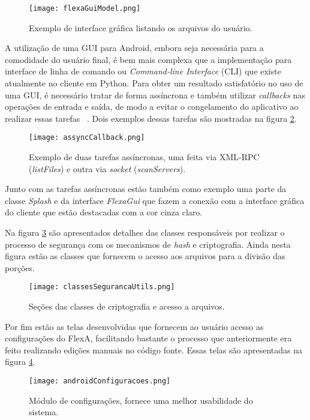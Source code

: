         \begin{figure}[!ht]
        \centering
        \texttt{[image: flexaGuiModel.png]}
        \caption{Exemplo de interface gráfica listando os arquivos do usuário.}
        \label{fig:flexaGuiModel}
        \end{figure}
        
        A utilização de uma GUI para Android, embora seja necessária para a comodidade do usuário final, é bem mais complexa que a implementação para interface de linha de comando ou \textit{Command-line Interface} (CLI) que existe atualmente no cliente em Python. Para obter um resultado satisfatório no uso de uma GUI, é necessário tratar de forma assíncrona e também utilizar \textit{callbacks} nas operações de entrada e saída, de modo a evitar o congelamento do aplicativo ao realizar essas tarefas ~\cite{androidAssyncTask}. Dois exemplos dessas tarefas são mostradas na figura \ref{fig:assyncCallback}.
        
        \begin{figure}[!ht]
        \centering
        \texttt{[image: assyncCallback.png]}
        \caption{Exemplo de duas tarefas assíncronas, uma feita via XML-RPC (\textit{listFiles}) e outra via \textit{socket} (\textit{scanServers}).}
        \label{fig:assyncCallback}
        \end{figure}
        
    Junto com as tarefas assíncronas estão também como exemplo uma parte da classe \textit{Splash} e da interface \textit{FlexaGui} que fazem a conexão com a interface gráfica do cliente que estão destacadas com a cor cinza claro.
    
    Na figura \ref{fig:classesSeg} são apresentados detalhes das classes responsáveis por realizar o processo de segurança com os mecanismos de \textit{hash} e criptografia. Ainda nesta figura estão as classes que fornecem o acesso aos arquivos para a divisão das porções.
    
        \begin{figure}[!ht]
        \centering
        \texttt{[image: classesSegurancaUtils.png]}
        \caption{Seções das classes de criptografia e acesso a arquivos.}
        \label{fig:classesSeg}
        \end{figure}
        
    Por fim estão as telas desenvolvidas que fornecem ao usuário acesso as configurações do FlexA, facilitando bastante o processo que anteriormente era feito realizando edições manuais no código fonte. Essas telas são apresentadas na figura \ref{fig:config}.
    
        \begin{figure}[!ht]
        \centering
        \texttt{[image: androidConfiguracoes.png]}
        \caption{Módulo de configurações, fornece uma melhor usabilidade do sistema.}
        \label{fig:config}
        \end{figure}
        
    
    